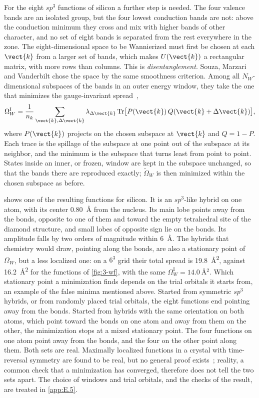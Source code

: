 For the eight $sp^3$ functions of silicon a further step is needed. The four valence bands are an isolated group, but the four lowest conduction bands are not: above the conduction minimum they cross and mix with higher bands of other character, and no set of eight bands is separated from the rest everywhere in the zone. The eight-dimensional space to be Wannierized must first be chosen at each $\vect{k}$ from a larger set of bands, which makes $U(\vect{k})$ a rectangular matrix, with more rows than columns. This is \emph{disentanglement}. Souza, Marzari and Vanderbilt chose the space by the same smoothness criterion. Among all $N_W$-dimensional subspaces of the bands in an outer energy window, they take the one that minimizes the gauge-invariant spread~\cite[Eqs.~(8) and (9)]{souza2001maximally},
\begin{equation}
  \Omega_W^{\mathrm{I}} = \frac{1}{n_k}\sum_{\vect{k},\Delta\vect{k}}\lambda_{\Delta\vect{k}}\,\mathrm{Tr}\bigl[P(\vect{k})\,Q(\vect{k} + \Delta\vect{k})\bigr],
  \label{eq:3.6-spillage}
\end{equation}
where $P(\vect{k})$ projects on the chosen subspace at $\vect{k}$ and $Q = 1 - P$. Each trace is the spillage of the subspace at one point out of the subspace at its neighbor, and the minimum is the subspace that turns least from point to point. States inside an inner, or frozen, window are kept in the subspace unchanged, so that the bands there are reproduced exactly; $\tilde\Omega_W$ is then minimized within the chosen subspace as before. 

 shows one of the resulting functions for silicon. It is an $sp^3$-like hybrid on one atom, with its center \SI{0.80}{\angstrom} from the nucleus. Its main lobe points away from the bonds, opposite to one of them and toward the empty tetrahedral site of the diamond structure, and small lobes of opposite sign lie on the bonds. Its amplitude falls by two orders of magnitude within \SI{6}{\angstrom}. The hybrids that chemistry would draw, pointing along the bonds, are also a stationary point of $\Omega_W$, but a less localized one: on a $6^3$ grid their total spread is \SI{19.8}{\angstrom^2}, against \SI{16.2}{\angstrom^2} for the functions of \cref{fig:3-wf}, with the same $\Omega_W^{\mathrm{I}} = \SI{14.0}{\angstrom^2}$. Which stationary point a minimization finds depends on the trial orbitals it starts from, an example of the false minima mentioned above. Started from symmetric $sp^3$ hybrids, or from randomly placed trial orbitals, the eight functions end pointing away from the bonds. Started from hybrids with the same orientation on both atoms, which point toward the bonds on one atom and away from them on the other, the minimization stops at a mixed stationary point. The four functions on one atom point away from the bonds, and the four on the other point along them. Both sets are real. Maximally localized functions in a crystal with time-reversal symmetry are found to be real, but no general proof exists~\cite{marzari1997maximally}; reality, a common check that a minimization has converged, therefore does not tell the two sets apart. The choice of windows and trial orbitals, and the checks of the result, are treated in \cref{app:E.5}.

